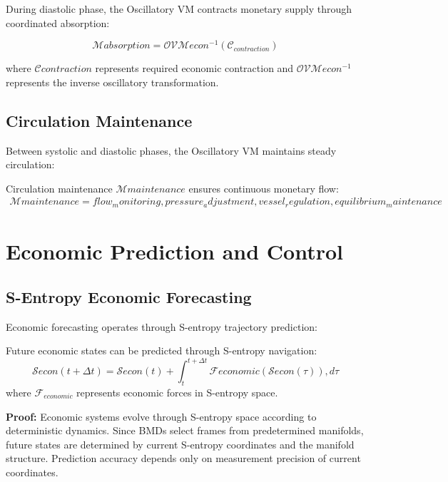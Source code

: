 During diastolic phase, the Oscillatory VM contracts monetary supply through coordinated absorption:

\begin{equation}
\mathcal{M}{absorption} = \mathcal{OVM}{econ}^{-1}(\mathcal{C}_{contraction})
\end{equation}

where $\mathcal{C}{contraction}$ represents required economic contraction and $\mathcal{OVM}{econ}^{-1}$ represents the inverse oscillatory transformation.

\subsection{Circulation Maintenance}

Between systolic and diastolic phases, the Oscillatory VM maintains steady circulation:

\begin{definition}
Circulation maintenance $\mathcal{M}{maintenance}$ ensures continuous monetary flow:
\begin{align}
\mathcal{M}{maintenance} = {flow_monitoring, pressure_adjustment, vessel_regulation, equilibrium_maintenance}
\end{align}
\end{definition}

\section{Economic Prediction and Control}

\subsection{S-Entropy Economic Forecasting}

Economic forecasting operates through S-entropy trajectory prediction:

\begin{theorem}
Future economic states can be predicted through S-entropy navigation:
\begin{equation}
\mathcal{S}{econ}(t + \Delta t) = \mathcal{S}{econ}(t) + \int_t^{t+\Delta t} \mathcal{F}{economic}(\mathcal{S}{econ}(\tau)) , d\tau
\end{equation}
where $\mathcal{F}_{economic}$ represents economic forces in S-entropy space.

\textbf{Proof:}
Economic systems evolve through S-entropy space according to deterministic dynamics. Since BMDs select frames from predetermined manifolds, future states are determined by current S-entropy coordinates and the manifold structure. Prediction accuracy depends only on measurement precision of current coordinates.
\end{theorem}

